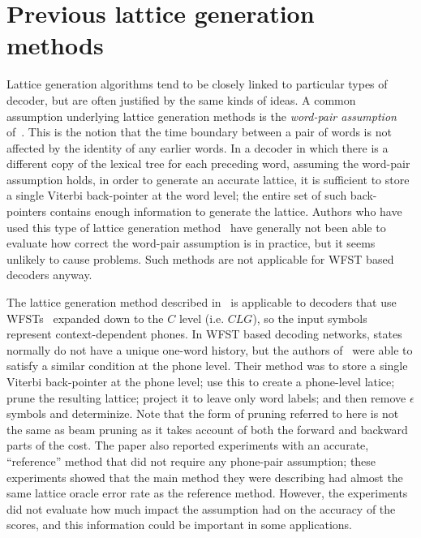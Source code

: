 \documentclass{article}
\begin{document}
\vspace*{-0.075in}
\section{Previous lattice generation methods}
\vspace*{-0.05in}
\label{sec:previous}

Lattice generation algorithms tend to be closely linked to particular types of decoder,
but are often justified by the same kinds of ideas.
A common assumption underlying lattice generation methods is the {\em word-pair assumption}
of~\cite{ney_word_graph}.  This is the notion that the time boundary between a pair of words
is not affected by the identity of any earlier words.  In a decoder in which there is
a different copy of the lexical tree for each preceding word, 
assuming the word-pair assumption holds, in order to generate an accurate lattice, it is
sufficient to store a single Viterbi back-pointer at the word level; the entire set of
such back-pointers contains enough information to generate the lattice.  Authors who have used
this type of lattice generation method~\cite{ney_word_graph,odell_thesis} have generally
not been able to evaluate how correct the word-pair assumption is in practice, but it seems
unlikely to cause problems.  Such methods are not applicable for WFST based decoders anyway.

The lattice generation method described in~\cite{efficient_general} 
is applicable to decoders that use WFSTs~\cite{wfst}
expanded down to the $C$ level (i.e. $CLG$), so the input symbols represent
context-dependent phones.  In WFST based decoding networks, states normally do
not have a unique one-word history, but the authors of~\cite{efficient_general}
were able to satisfy a similar condition at the phone level.  Their method was
to store a single Viterbi back-pointer at the phone level; use this to 
create a phone-level latice; prune the resulting
lattice; project it to leave only word labels; and then remove $\epsilon$
symbols and determinize.
Note that the form of pruning referred to here is not the same as beam pruning as
it takes account of both the forward and backward parts of the cost.
The paper also reported experiments with an accurate, ``reference'' method that did not require any
phone-pair assumption; these experiments showed that the main method they were describing
had almost the same lattice oracle error rate as the reference method.  However, the 
experiments did not evaluate how much impact the assumption had on the accuracy of the scores, 
and this information could be important in some applications.
\end{document}
